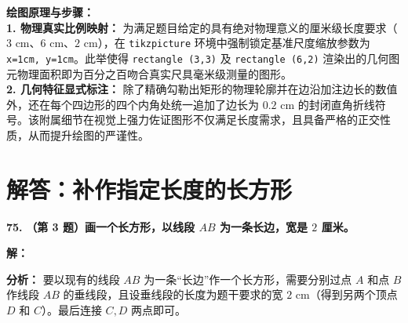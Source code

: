 \documentclass[12pt, a4paper]{ctexrep}
\begin{document}
\vspace{0.4cm}
{\small\color{blue!70!black}
\textbf{绘图原理与步骤：}\\
\textbf{1. 物理真实比例映射：} 为满足题目给定的具有绝对物理意义的厘米级长度要求（$3\text{ cm}$、$6\text{ cm}$、$2\text{ cm}$），在 \texttt{tikzpicture} 环境中强制锁定基准尺度缩放参数为 \texttt{x=1cm, y=1cm}。此举使得 \texttt{rectangle (3,3)} 及 \texttt{rectangle (6,2)} 渲染出的几何图元物理面积即为百分之百吻合真实尺具毫米级测量的图形。\\
\textbf{2. 几何特征显式标注：} 除了精确勾勒出矩形的物理轮廓并在边沿加注边长的数值外，还在每个四边形的四个内角处统一追加了边长为 $0.2\text{ cm}$ 的封闭直角折线符号。该附属细节在视觉上强力佐证图形不仅满足长度需求，且具备严格的正交性质，从而提升绘图的严谨性。
}

\newpage

\section{解答：补作指定长度的长方形}

\vspace{0.6cm}

\textbf{\LARGE 75.} \textbf{（第 3 题）画一个长方形，以线段 $AB$ 为一条长边，宽是 $2$ 厘米。}

\vspace{0.4cm}
\textbf{解：}

\textbf{分析：} 要以现有的线段 $AB$ 为一条“长边”作一个长方形，需要分别过点 $A$ 和点 $B$ 作线段 $AB$ 的垂线段，且设垂线段的长度为题干要求的宽 $2\text{ cm}$（得到另两个顶点 $D$ 和 $C$）。最后连接 $C, D$ 两点即可。
\end{document}
